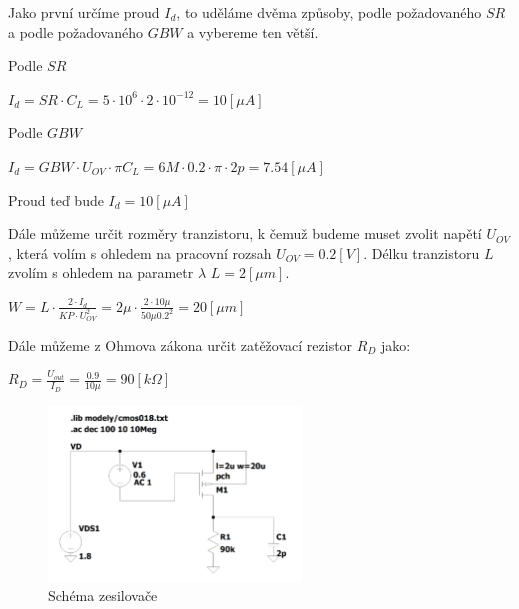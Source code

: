 Jako první určíme proud \(I_d\), to uděláme dvěma způsoby, podle požadovaného \(SR\) a podle požadovaného \(GBW\) a vybereme ten větší.


Podle \(SR\)
\begin{center}
    \large
    \(
        I_d = SR \cdot C_L = 5 \cdot 10^{6} \cdot 2 \cdot 10^{-12} = 10 [\mu A]
    \)
\end{center}

Podle \(GBW\) 
\begin{center}
    \large
    \(
        I_d = GBW \cdot U_{OV} \cdot \pi C_L = 6M \cdot 0.2 \cdot \pi \cdot 2p = 7.54 [\mu A]
    \)
\end{center}

Proud teď bude \(I_d = 10 [\mu A]\) 

Dále můžeme určit rozměry tranzistoru, k čemuž budeme muset zvolit napětí \(U_{OV}\), která volím s ohledem na pracovní rozsah \(U_{OV} = 0.2 [V]\).
Délku tranzistoru \(L\) zvolím s ohledem na parametr \(\lambda\) \(L = 2 [\mu m]\).

\begin{center}
    \large
    \(
        W = L \cdot \frac{2 \cdot I_d}{KP \cdot U_{OV}^2} = 2\mu \cdot \frac{2 \cdot 10\mu}{50\mu 0.2^2} = 20 [\mu m]
    \)
\end{center}

Dále můžeme z Ohmova zákona určit zatěžovací rezistor \(R_D\) jako:

\begin{center}
    \Large
    \(
        R_D = \frac{U_{out}}{I_D} = \frac{0.9}{10\mu} = 90 [k\Omega] 
    \)
\end{center}

\vspace{10mm}
\begin{figure}[h!]
    \centering
    \includegraphics[width=0.6\textwidth]{text/img/Res-sch.png}
    \caption{\label{fig:res-sch} Schéma zesilovače}
\end{figure}

